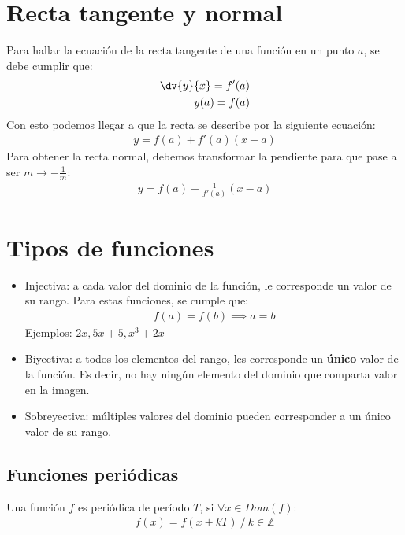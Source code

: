 \documentclass{article}
\begin{document}
\section{Recta tangente y normal}
Para hallar la ecuación de la recta tangente de una función en un punto $a$, se debe cumplir que:
\begin{equation}
    \begin{split}
        \dv{y}{x}=f'(a)\\
        y(a)=f(a)
    \end{split}
\end{equation}
Con esto podemos llegar a que la recta se describe por la siguiente ecuación:
\begin{equation}
    \begin{split}
        y=f(a)+f'(a)(x-a)
    \end{split}
\end{equation}
Para obtener la recta normal, debemos transformar la pendiente para que pase a ser $m \to - \frac{1}{m}$:
\begin{equation}
    \begin{split}
        y= f(a) -\frac{1}{f'(a)}(x-a)
    \end{split}
\end{equation} 
\section{Tipos de funciones}
\begin{itemize}
    \item Injectiva: a cada valor del dominio de la función, le corresponde un valor de su rango.
    Para estas funciones, se cumple que:
    \begin{equation}
        \begin{split}
            f(a) = f(b) \implies a = b
        \end{split}
    \end{equation}
    Ejemplos: $2x, 5x+5, x^3 + 2x$
    \item Biyectiva: a todos los elementos del rango, les corresponde un \textbf{único}
    valor de la función. Es decir, no hay ningún elemento del dominio que comparta valor en
    la imagen.
    \item Sobreyectiva: múltiples valores del dominio pueden corresponder a un único valor de su rango.
\end{itemize}
\subsection{Funciones periódicas}
Una función $f$ es periódica de período $T$, si $\forall x \in Dom(f)$:
\begin{equation}
    \begin{split}
        f(x)=f(x+ kT)\: / \: k \in  \mathbb{Z}
    \end{split}
\end{equation}
\end{document}
